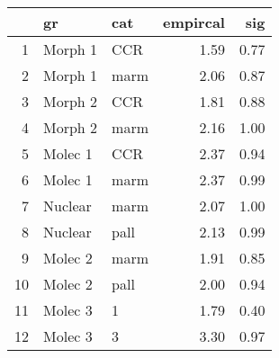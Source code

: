 \begin{table}[ht]
\centering
\begin{tabular}{rllrr}
  \hline
 & gr & cat & empircal & sig \\ 
  \hline
1 & Morph 1 & CCR & 1.59 & 0.77 \\ 
  2 & Morph 1 & marm & 2.06 & 0.87 \\ 
  3 & Morph 2 & CCR & 1.81 & 0.88 \\ 
  4 & Morph 2 & marm & 2.16 & 1.00 \\ 
  5 & Molec 1 & CCR & 2.37 & 0.94 \\ 
  6 & Molec 1 & marm & 2.37 & 0.99 \\ 
  7 & Nuclear & marm & 2.07 & 1.00 \\ 
  8 & Nuclear & pall & 2.13 & 0.99 \\ 
  9 & Molec 2 & marm & 1.91 & 0.85 \\ 
  10 & Molec 2 & pall & 2.00 & 0.94 \\ 
  11 & Molec 3 & 1 & 1.79 & 0.40 \\ 
  12 & Molec 3 & 3 & 3.30 & 0.97 \\ 
   \hline
\end{tabular}
\label{rfmiss}
\end{table}
